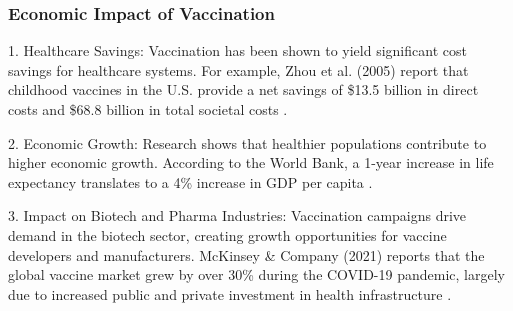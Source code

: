 \documentclass[12pt]{beamer}
\begin{document}

    


\begin{frame}
\frametitle{Economic Impact of Vaccination}

1. Healthcare Savings: Vaccination has been shown to yield significant cost savings for healthcare systems. For example, Zhou et al. (2005) report that childhood vaccines in the U.S. provide a net savings of \$13.5 billion in direct costs and \$68.8 billion in total societal costs \cite{zhou2005economic}.

2. Economic Growth: Research shows that healthier populations contribute to higher economic growth. According to the World Bank, a 1-year increase in life expectancy translates to a 4\% increase in GDP per capita \cite{worldbank1993health}.

3. Impact on Biotech and Pharma Industries: Vaccination campaigns drive demand in the biotech sector, creating growth opportunities for vaccine developers and manufacturers. McKinsey & Company (2021) reports that the global vaccine market grew by over 30\% during the COVID-19 pandemic, largely due to increased public and private investment in health infrastructure \cite{mckinsey2021biotech}.
\end{frame}
\end{document}

